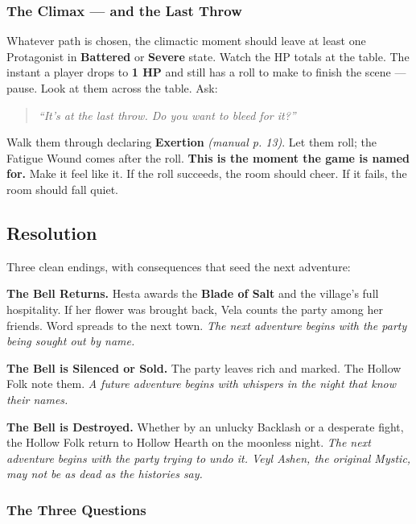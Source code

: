 \documentclass[10pt,a4paper]{article}
\begin{document}
\subsubsection{The Climax --- and the Last Throw}\label{the-climax--and-the-last-throw}

Whatever path is chosen, the climactic moment should leave at least one Protagonist in \textbf{Battered} or \textbf{Severe} state. Watch the HP totals at the table. The instant a player drops to \textbf{1 HP} and still has a roll to make to finish the scene --- pause. Look at them across the table. Ask:

\begin{quote}
\emph{“It’s at the last throw. Do you want to bleed for it?”}
\end{quote}

Walk them through declaring \textbf{Exertion} \emph{(manual p. 13)}. Let them roll; the Fatigue Wound comes after the roll. \textbf{This is the moment the game is named for.} Make it feel like it. If the roll succeeds, the room should cheer. If it fails, the room should fall quiet.

\par\vspace{3pt}

\subsection{Resolution}\label{resolution}

Three clean endings, with consequences that seed the next adventure:

\textbf{The Bell Returns.} Hesta awards the \textbf{Blade of Salt} and the village’s full hospitality. If her flower was brought back, Vela counts the party among her friends. Word spreads to the next town. \emph{The next adventure begins with the party being sought out by name.}

\textbf{The Bell is Silenced or Sold.} The party leaves rich and marked. The Hollow Folk note them. \emph{A future adventure begins with whispers in the night that know their names.}

\textbf{The Bell is Destroyed.} Whether by an unlucky Backlash or a desperate fight, the Hollow Folk return to Hollow Hearth on the moonless night. \emph{The next adventure begins with the party trying to undo it. Veyl Ashen, the original Mystic, may not be as dead as the histories say.}

\subsubsection{The Three Questions}\label{the-three-questions}
\end{document}
